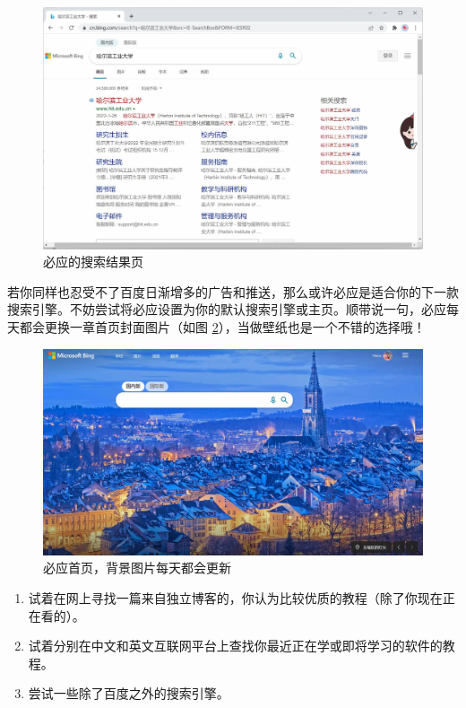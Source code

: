 \begin{figure}[htb!]
  \centering
  \includegraphics[width=12cm]{assets/Bing_1.jpg}
  \caption{必应的搜索结果页}
  \label{Bing_1}
\end{figure}

若你同样也忍受不了百度日渐增多的广告和推送，那么或许必应是适合你的下一款搜索引擎。不妨尝试将必应设置为你的默认搜索引擎或主页。顺带说一句，必应每天都会更换一章首页封面图片（如图 \ref{Bing_2}），当做壁纸也是一个不错的选择哦！

\begin{figure}[htb!]
  \centering
  \includegraphics[width=12cm]{assets/Bing_2.jpg}
  \caption{必应首页，背景图片每天都会更新}
  \label{Bing_2}
\end{figure}

\practice

\begin{enumerate}
  \item 试着在网上寻找一篇来自独立博客的，你认为比较优质的教程（除了你现在正在看的）。
  \item 试着分别在中文和英文互联网平台上查找你最近正在学或即将学习的软件的教程。
  \item 尝试一些除了百度之外的搜索引擎。
\end{enumerate}
